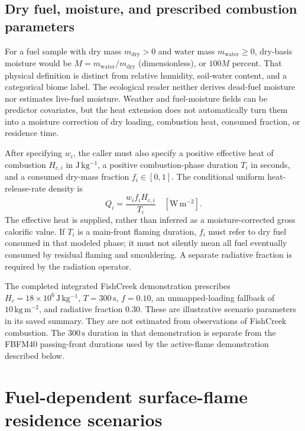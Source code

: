 \documentclass[11pt,a4paper]{article}
\begin{document}
\subsection{Dry fuel, moisture, and prescribed combustion parameters}

For a fuel sample with dry mass $m_{\mathrm{dry}}>0$ and water mass
$m_{\mathrm{water}}\geq0$, dry-basis moisture would be
$M=m_{\mathrm{water}}/m_{\mathrm{dry}}$ (dimensionless), or $100M$ percent. That
physical definition is distinct from relative humidity, soil-water content,
and a categorical biome label. The ecological reader neither derives
dead-fuel moisture nor estimates live-fuel moisture. Weather and fuel-moisture
fields can be predictor covariates, but the heat extension does not
automatically turn them into a moisture correction of dry loading, combustion
heat, consumed fraction, or residence time.

After specifying $w_i$, the caller must also specify a positive effective heat
of combustion $H_{c,i}$ in $\mathrm{J\,kg^{-1}}$, a positive combustion-phase
duration $T_i$ in seconds, and a consumed dry-mass fraction $f_i\in[0,1]$.
The conditional uniform heat-release-rate density is
\begin{equation}
 Q_i=\frac{w_i f_i H_{c,i}}{T_i}
 \quad[\mathrm{W\,m^{-2}}].
 \label{eq:ecology-conditional-hrr}
\end{equation}
The effective heat is supplied, rather than inferred as a moisture-corrected
gross calorific value. If $T_i$ is a main-front flaming duration, $f_i$ must
refer to dry fuel consumed in that modeled phase; it must not silently mean
all fuel eventually consumed by residual flaming and smouldering. A separate
radiative fraction is required by the radiation operator.

The completed integrated FishCreek demonstration prescribes
$H_c=18\times10^6\,\mathrm{J\,kg^{-1}}$, $T=300\,\mathrm{s}$,
$f=0.10$, an unmapped-loading fallback of
$10\,\mathrm{kg\,m^{-2}}$, and radiative fraction $0.30$.
These are illustrative scenario parameters in its saved summary. They are not
estimated from observations of FishCreek combustion. The $300\,\mathrm{s}$
duration in that demonstration is separate from the FBFM40 passing-front
durations used by the active-flame demonstration described below.

\section{Fuel-dependent surface-flame residence scenarios}
\label{sec:residence}
\end{document}
